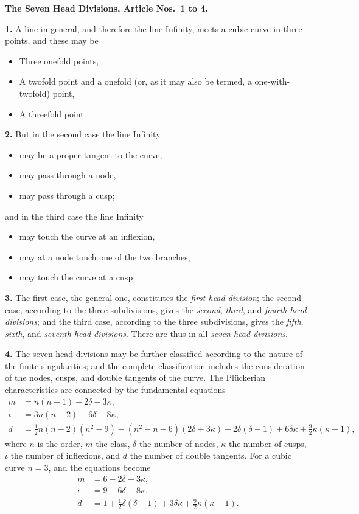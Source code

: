\documentclass[11pt,a4paper]{article}
\theoremstyle{plain}
\theoremstyle{definition}
\begin{document}
\bigskip

\noindent\textbf{The Seven Head Divisions, Article Nos.~1 to 4.}

\medskip

\textbf{1.} A line in general, and therefore the line Infinity, meets a cubic curve in three points, and these may be
\begin{itemize}
\item Three onefold points,
\item A twofold point and a onefold (or, as it may also be termed, a one-with-twofold) point,
\item A threefold point.
\end{itemize}

\textbf{2.} But in the second case the line Infinity
\begin{itemize}
\item may be a proper tangent to the curve,
\item may pass through a node,
\item may pass through a cusp;
\end{itemize}
and in the third case the line Infinity
\begin{itemize}
\item may touch the curve at an inflexion,
\item may at a node touch one of the two branches,
\item may touch the curve at a cusp.
\end{itemize}

\textbf{3.} The first case, the general one, constitutes the \textit{first head division}; the second case, according to the three subdivisions, gives the \textit{second}, \textit{third}, and \textit{fourth head divisions}; and the third case, according to the three subdivisions, gives the \textit{fifth}, \textit{sixth}, and \textit{seventh head divisions}. There are thus in all \textit{seven head divisions}.

\textbf{4.} The seven head divisions may be further classified according to the nature of the finite singularities; and the complete classification includes the consideration of the nodes, cusps, and double tangents of the curve. The Pl\"{u}ckerian characteristics are connected by the fundamental equations
\begin{align*}
m &= n(n-1) - 2\delta - 3\kappa, \\
\iota &= 3n(n-2) - 6\delta - 8\kappa, \\
d &= \tfrac{1}{2}n(n-2)(n^2-9) - (n^2-n-6)(2\delta+3\kappa) + 2\delta(\delta-1) + 6\delta\kappa + \tfrac{9}{2}\kappa(\kappa-1),
\end{align*}
where $n$ is the order, $m$ the class, $\delta$ the number of nodes, $\kappa$ the number of cusps, $\iota$ the number of inflexions, and $d$ the number of double tangents. For a cubic curve $n = 3$, and the equations become
\begin{align*}
m &= 6 - 2\delta - 3\kappa, \\
\iota &= 9 - 6\delta - 8\kappa, \\
d &= 1 + \tfrac{1}{2}\delta(\delta-1) + 3\delta\kappa + \tfrac{9}{2}\kappa(\kappa-1).
\end{align*}
\end{document}
